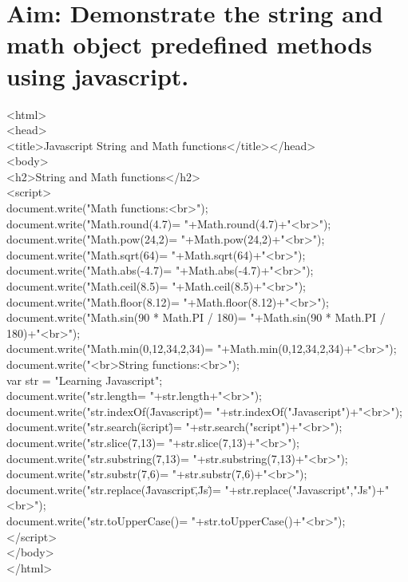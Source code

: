 \section*{\fontsize{16}{14}\selectfont Aim: Demonstrate the string and math object predefined methods using javascript.}
<html>\\
<head>\\
<title>Javascript String and Math functions</title></head>\\
<body>\\
<h2>String and Math functions</h2>\\
<script>\\
document.write("Math functions:<br>");\\
document.write("Math.round(4.7)=  "+Math.round(4.7)+"<br>");\\
document.write("Math.pow(24,2)= "+Math.pow(24,2)+"<br>");\\
document.write("Math.sqrt(64)= "+Math.sqrt(64)+"<br>");\\
document.write("Math.abs(-4.7)= "+Math.abs(-4.7)+"<br>");\\
document.write("Math.ceil(8.5)= "+Math.ceil(8.5)+"<br>");\\
document.write("Math.floor(8.12)= "+Math.floor(8.12)+"<br>");\\
document.write("Math.sin(90 * Math.PI / 180)= "+Math.sin(90 * Math.PI / 180)+"<br>");\\
document.write("Math.min(0,12,34,2,34)= "+Math.min(0,12,34,2,34)+"<br>");\\
document.write("<br>String functions:<br>");\\
var str = "Learning Javascript";\\
document.write("str.length= "+str.length+"<br>");\\
document.write("str.indexOf(\"Javascript\")= "+str.indexOf("Javascript")+"<br>");\\
document.write("str.search(\"script\")= "+str.search("script")+"<br>");\\
document.write("str.slice(7,13)= "+str.slice(7,13)+"<br>");\\
document.write("str.substring(7,13)= "+str.substring(7,13)+"<br>");\\
document.write("str.substr(7,6)= "+str.substr(7,6)+"<br>");\\
document.write("str.replace(\"Javascript\",\"Js\")= "+str.replace("Javascript","Js")+"<br>");\\
document.write("str.toUpperCase()= "+str.toUpperCase()+"<br>");\\
</script>\\
</body>\\
</html>

